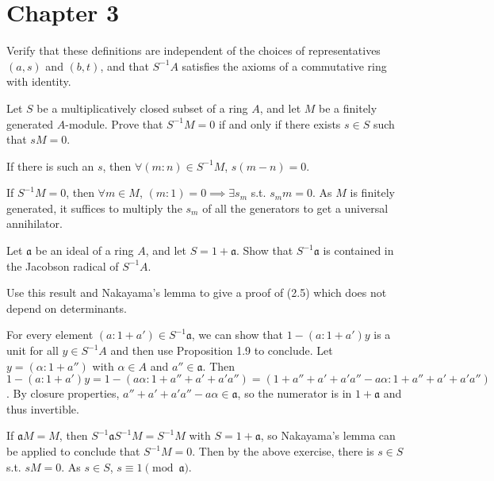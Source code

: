 \documentclass[a4paper]{exam}
\newif\ifhint
\begin{document}
\section{Chapter 3}

\begin{questions}
\question Verify that these definitions are independent of the choices of representatives $(a,s) $ and $(b,t) $, and that $S^{-1}A $ satisfies the axioms of a commutative ring with identity.
\end{questions}

\begin{questions}
\question Let $S$ be a multiplicatively closed subset of a ring $A $, and let $M$ be a finitely generated $A$-module. Prove that $S^{-1} M = 0$ if and only if there exists $s \in S$ such that $sM = 0$.
\begin{solution}
	If there is such an $s $, then $\forall (m:n) \in S^{-1}M $, $s(m-n) = 0$.

	If $S^{-1}M = 0 $, then $\forall m \in M $, $(m:1) = 0 \implies \exists s_m$ s.t. $s_m m = 0$.
	As $M$ is finitely generated, it suffices to multiply the $s_m$ of all the generators to get a universal annihilator.
\end{solution}

\question Let $\mathfrak{a}$ be an ideal of a ring $A $, and let $S = 1 + \mathfrak{a}$. Show that $S^{-1}\mathfrak{a}$ is contained in the Jacobson radical of $S^{-1}A$.

Use this result and Nakayama's lemma to give a proof of (2.5) which does not depend on determinants.
\ifhint
	If $M = \mathfrak{a}M $, then $S^{-1}M = (S^{-1}\mathfrak{a})(S^{-1}M) $, hence by Nakayama we have $S^{-1}M = 0 $. Now use Exercise 1
\fi
\begin{solution}
	For every element $(a:1+a') \in S^{-1}\mathfrak{a} $, we can show that $1 - (a:1+a')y $ is a unit for all $y\in S^{-1}A $ and then use Proposition 1.9 to conclude.
	Let $y = (\alpha :1+a'') $ with $\alpha  \in A $ and $a'' \in \mathfrak{a} $.
	Then $1 - (a:1+a')y = 1 - (a\alpha :1+a''+a'+a'a'') = (1+a''+a'+a'a'' - a\alpha :1+a''+a'+a'a'') $.
	By closure properties, $a''+a'+a'a''-a\alpha  \in \mathfrak{a} $, so the numerator is in $1+\mathfrak{a} $ and thus invertible.

	If $\mathfrak{a}M = M $, then $S^{-1}\mathfrak{a}S^{-1}M = S^{-1}M $ with $S = 1 + \mathfrak{a} $, so Nakayama's lemma can be applied to conclude that $S^{-1}M = 0 $.
	Then by the above exercise, there is $s \in S $ s.t. $sM = 0 $.
	As $s \in S $, $s \equiv 1\pmod {\mathfrak{a}} $.
\end{solution}


\end{questions}
\end{document}
